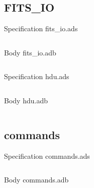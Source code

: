 \documentclass[a4paper,10pt]{article}
\begin{document}
\subsection{FITS\_IO}

Specification fits\_io.ads
\inputminted{ada}{../fits_io.ads}

Body fits\_io.adb
\inputminted{ada}{../fits_io.adb}

Specification hdu.ads
\inputminted{ada}{../hdu.ads}

Body hdu.adb
\inputminted{ada}{../hdu.adb}


\subsection{commands}

Specification commands.ads
\inputminted{ada}{../commands.ads}

Body commands.adb
\inputminted{ada}{../commands.adb}


\end{document}
